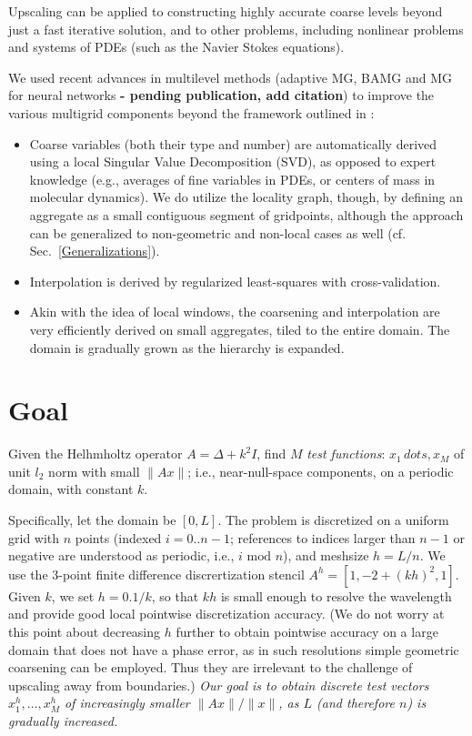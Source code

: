\documentclass{article}
\begin{document}
Upscaling can be applied to constructing highly accurate coarse levels beyond just a fast iterative solution, and to other problems, including nonlinear problems and systems of PDEs (such as the Navier Stokes equations).

We used recent advances in multilevel methods (adaptive MG, BAMG \cite{bamg, lamg, mg_guide} and MG for neural networks \textbf{- pending publication, add citation}) to improve the various multigrid components beyond the framework outlined in \cite{su}:
\begin{itemize}
	\item Coarse variables (both their type and number) are automatically derived using a local Singular Value Decomposition (SVD), as opposed to expert knowledge (e.g., averages of fine variables in PDEs, or centers of mass in molecular dynamics). We do utilize the locality graph, though, by defining an aggregate as a small contiguous segment of gridpoints, although the approach can be generalized to non-geometric and non-local cases as well (cf. Sec.~\ref{Generalizations}).
	\item Interpolation is derived by regularized least-squares with cross-validation.
	\item Akin with the idea of local windows, the coarsening and interpolation are very efficiently derived on small aggregates, tiled to the entire domain. The domain is gradually grown as the hierarchy is expanded.
\end{itemize}

\section{Goal}
Given the Helhmholtz operator $A = \Delta + k^2 I$, find $M$ \emph{test functions}: $x_1\,dots,x_M$ of unit $l_2$ norm with small $\|A x\|$; i.e., near-null-space components, on a periodic domain, with constant $k$. 

Specifically, let the domain be $[0,L]$. The problem is discretized on a uniform grid with $n$ points (indexed $i = 0..n-1$; references to indices larger than $n - 1$ or negative are understood as periodic, i.e., $i \text{ mod } n$), and meshsize $h = L/n$. We use the 3-point finite difference discrertization stencil $A^h = [1, -2 + (kh)^2, 1]$. Given $k$, we set $h = 0.1/k$, so that $kh$ is small enough to resolve the wavelength and provide good local pointwise discretization accuracy. (We do not worry at this point about decreasing $h$ further to obtain pointwise accuracy on a large domain that does not have a phase error, as in such resolutions simple geometric coarsening can be employed. Thus they are irrelevant to the challenge of upscaling away from boundaries.) \emph{Our goal is to obtain discrete test vectors $x^h_1,\dots,x^h_M$ of increasingly smaller $\|A x\|/\|x\|$, as $L$ (and therefore $n$) is gradually increased.}
\end{document}
